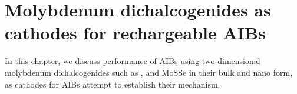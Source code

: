 \chapter{Molybdenum dichalcogenides as cathodes for rechargeable AIBs} %
In this chapter, we discuss performance of AIBs using two-dimensional molybdenum dichalcogenides such as ,  and MoSSe in their bulk and nano form, as cathodes for AIBs attempt to establish their mechanism.
\label{chap4} %


